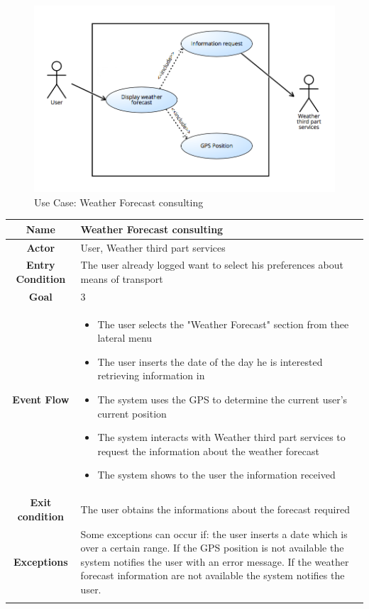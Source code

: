 \documentclass[numbers=noenddot, 12pt, a4paper, oneside]{scrbook}
\begin{document}
\begin{figure}[H]
	\includegraphics[width=1\textwidth]{usecases/Scenario4}
	\caption{Use Case: Weather Forecast consulting}
\end{figure}

\begin{tabular}{|c|p{}|}
	\hline
	\parbox[c][6ex]{6ex}{\centering \textbf{Name}} & Weather Forecast consulting
	
	\\
	\hline
	\parbox[c][6ex]{6ex}{\centering \textbf{Actor}} & User, Weather third part services
	 \\
	\hline
	\parbox[c][10ex]{15ex}{\centering \textbf{Entry Condition}} & The user already logged want to select his preferences about means of transport
	\\
	\hline
	\parbox[c][6ex]{15ex}{\centering \textbf{Goal}} &  3\\
	\hline
	\parbox[c][10ex]{12ex}{\centering \textbf{Event Flow}} & \begin{itemize}
		\item The user selects the "Weather Forecast" section from thee lateral menu
		\item The user inserts the date of the day he is interested retrieving information in
		\item The system uses the GPS to determine the current user's current position
		\item The system interacts with Weather third part services to request the information about the weather forecast
		\item The system shows to the user the information received
		
		
	\end{itemize}\\
	\hline
	\parbox[c][7ex]{12ex}{\centering \textbf{Exit condition}} & The user obtains the informations about the forecast required\\\hline
	\parbox[c][10ex]{13ex}{\centering \textbf{Exceptions}} & Some exceptions can occur if: the user inserts a date which is over a certain range. If the GPS position is not available the system notifies the user with an error message. If the weather forecast information are not available the system notifies the user.
	 
	\\ \\ \hline	
	
	
\end{tabular}
\end{document}
